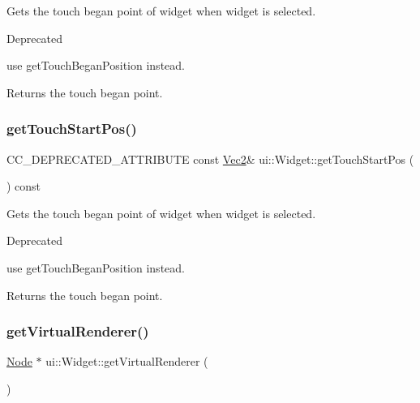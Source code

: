 Gets the touch began point of widget when widget is selected. \begin{DoxyRefDesc}{Deprecated}
\item[\hyperlink{deprecated__deprecated000177}{Deprecated}]use {\ttfamily get\+Touch\+Began\+Position} instead. \end{DoxyRefDesc}
\begin{DoxyReturn}{Returns}
the touch began point. 
\end{DoxyReturn}
\mbox{\label{classui_1_1Widget_a6b930ace2f89e8fe077836d49701fda3}} 
\subsubsection{\texorpdfstring{get\+Touch\+Start\+Pos()}{getTouchStartPos()}\hspace{0.1cm}{\footnotesize\ttfamily [2/2]}}
{\footnotesize\ttfamily C\+C\+\_\+\+D\+E\+P\+R\+E\+C\+A\+T\+E\+D\+\_\+\+A\+T\+T\+R\+I\+B\+U\+TE const \hyperlink{classVec2}{Vec2}\& ui\+::\+Widget\+::get\+Touch\+Start\+Pos (\begin{DoxyParamCaption}{ }\end{DoxyParamCaption}) const\hspace{0.3cm}{\ttfamily [inline]}}

Gets the touch began point of widget when widget is selected. \begin{DoxyRefDesc}{Deprecated}
\item[\hyperlink{deprecated__deprecated000412}{Deprecated}]use {\ttfamily get\+Touch\+Began\+Position} instead. \end{DoxyRefDesc}
\begin{DoxyReturn}{Returns}
the touch began point. 
\end{DoxyReturn}
\mbox{\label{classui_1_1Widget_acf862bf9235fbb3823819eeb65d46f25}} 
\subsubsection{\texorpdfstring{get\+Virtual\+Renderer()}{getVirtualRenderer()}\hspace{0.1cm}{\footnotesize\ttfamily [1/2]}}
{\footnotesize\ttfamily \hyperlink{classNode}{Node} $\ast$ ui\+::\+Widget\+::get\+Virtual\+Renderer (\begin{DoxyParamCaption}{ }\end{DoxyParamCaption})\hspace{0.3cm}{\ttfamily [virtual]}}

